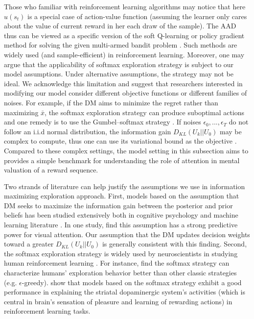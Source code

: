 \documentclass[
  12pt,
]{article}
\begin{document}
Those who familiar with reinforcement learning algorithms may notice
that here \(u(s_t)\) is a special case of action-value function
(assuming the learner only cares about the value of current reward in
her each draw of the sample). The AAD thus can be viewed as a specific
version of the soft Q-learning or policy gradient method for solving the
given multi-armed bandit problem
\citep{haarnoja2017reinforcement, schulman2017equivalence}. Such methods
are widely used (and sample-efficient) in reinforcement learning.
Moreover, one may argue that the applicability of softmax exploration
strategy is subject to our model assumptions. Under alternative
assumptions, the strategy may not be ideal. We acknowledge this
limitation and suggest that researchers interested in modifying our
model consider different objective functions or different families of
noises. For example, if the DM aims to minimize the regret rather than
maximizing \(\bar{x}\), the softmax exploration strategy can produce
suboptimal actions and one remedy is to use the Gumbel--softmax strategy
\citep{cesa2017boltzmann}. If noises \(\epsilon_0,...,\epsilon_T\) do
not follow an i.i.d normal distribution, the information gain
\(D_{KL}(U_k||U_0)\) may be complex to compute, thus one can use its
variational bound as the objective \citep{houthooft2016vime}. Compared
to these complex settings, the model setting in this subsection aims to
provides a simple benchmark for understanding the role of attention in
mental valuation of a reward sequence.

Two strands of literature can help justify the assumptions we use in
information maximizing exploration approach. First, models based on the
assumption that DM seeks to maximize the information gain between the
posterior and prior beliefs has been studied extensively both in
cognitive psychology
\citep{oaksford1994rational, itti2009bayesian, friston2017active} and
machine learning literature \citep{settles2009active, ren2021survey}. In
one study, \citet{itti2009bayesian} find this assumption has a strong
predictive power for visual attention. Our assumption that the DM
updates decision weights toward a greater \(D_{KL}(U_k||U_0)\) is
generally consistent with this finding. Second, the softmax exploration
strategy is widely used by neuroscientists in studying human
reinforcement learning
\citep{daw2006cortical, fitzgerald2012action, collins2014opponent, niv2015reinforcement, leong2017dynamic}.
For instance, \citet{daw2006cortical} find the softmax strategy can
characterize humans' exploration behavior better than other classic
strategies (e.g. \(\epsilon\)-greedy). \citet{collins2014opponent} show
that models based on the softmax strategy exhibit a good performance in
explaining the striatal dopaminergic system's activities (which is
central in brain's sensation of pleasure and learning of rewarding
actions) in reinforcement learning tasks.
\end{document}
